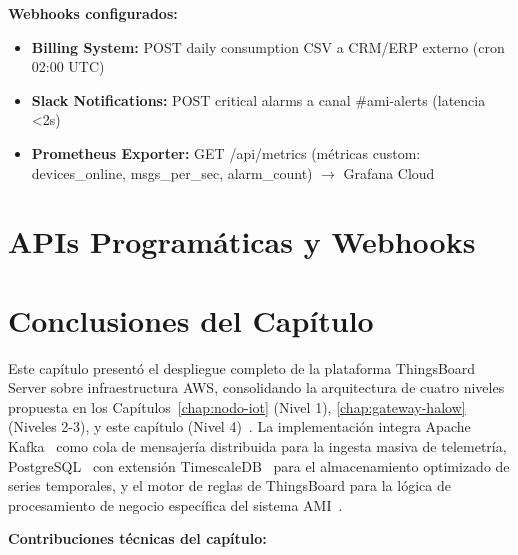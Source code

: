 \textbf{Webhooks configurados:}

\begin{itemize}
    \item \textbf{Billing System:} POST daily consumption CSV a CRM/ERP externo (cron 02:00 UTC)
    \item \textbf{Slack Notifications:} POST critical alarms a canal \#ami-alerts (latencia <2s)
    \item \textbf{Prometheus Exporter:} GET /api/metrics (métricas custom: devices\_online, msgs\_per\_sec, alarm\_count) $\rightarrow$ Grafana Cloud
\end{itemize}

\section{APIs Programáticas y Webhooks}
\label{sec:server-apis}


\section{Conclusiones del Capítulo}
\label{sec:server-conclusiones}

Este capítulo presentó el despliegue completo de la plataforma ThingsBoard Server sobre infraestructura AWS, consolidando la arquitectura de cuatro niveles propuesta en los Capítulos~\ref{chap:nodo-iot} (Nivel 1), \ref{chap:gateway-halow} (Niveles 2-3), y este capítulo (Nivel 4)~\cite{wulurCoordinationEdgeCloud2024,andriuloEdgeComputingCloud2024}. La implementación integra Apache Kafka~\cite{kraborKafkaPerformanceScalability2023} como cola de mensajería distribuida para la ingesta masiva de telemetría, PostgreSQL~\cite{postgresqlDocumentation2024} con extensión TimescaleDB~\cite{freedmanTimescaleDBSQLMade2024} para el almacenamiento optimizado de series temporales, y el motor de reglas de ThingsBoard para la lógica de procesamiento de negocio específica del sistema AMI~\cite{mccaffertyEnergyIoTArchitecture2023}.

\textbf{Contribuciones técnicas del capítulo:}

